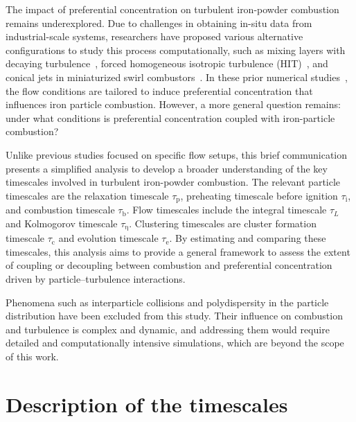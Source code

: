 \documentclass[authoryear,preprint,review,12pt]{elsarticle}
\newcommand{\tauk}{\tau_\mathrm{\eta}}
\newcommand{\red}{}
\begin{document}
{The impact of preferential concentration on turbulent iron-powder combustion remains underexplored. Due to challenges in obtaining in-situ data from industrial-scale systems, researchers have proposed various alternative configurations to study this process computationally, such as mixing layers with decaying turbulence~\cite{Hemamalini2024,Luu2024}, forced homogeneous isotropic turbulence (HIT)~\cite{Thaeter2024}, and conical jets in miniaturized swirl combustors~\cite{STEFFENS2025}. In these prior numerical studies~\cite{Hemamalini2024,Luu2024,Thaeter2024}, the flow conditions are tailored to induce preferential concentration that influences iron particle combustion. However, a more general question remains: under what conditions is preferential concentration coupled with iron-particle combustion?

Unlike previous studies focused on specific flow setups, this brief communication presents a simplified analysis to develop a broader understanding of the key timescales involved in turbulent iron-powder combustion. The relevant particle timescales are the relaxation timescale $\tau_\mathrm{p}$, preheating timescale before ignition $\tau_\mathrm{i}$, and combustion timescale $\tau_\mathrm{b}$. Flow timescales include the integral timescale $\tau_L$ and Kolmogorov timescale $\tauk$. Clustering timescales are cluster formation timescale $\tau_\mathrm{c}$ and evolution timescale $\tau_\mathrm{e}$. By estimating and comparing these timescales, this analysis aims to provide a general framework to assess the extent of coupling or decoupling between combustion and preferential concentration driven by particle–turbulence interactions.} {\red Phenomena such as interparticle collisions and polydispersity in the particle distribution have been excluded from this study. Their influence on combustion and turbulence is complex and dynamic, and addressing them would require detailed and computationally intensive simulations, which are beyond the scope of this work.}

\section{Description of the timescales}\label{sec:description}
\end{document}
